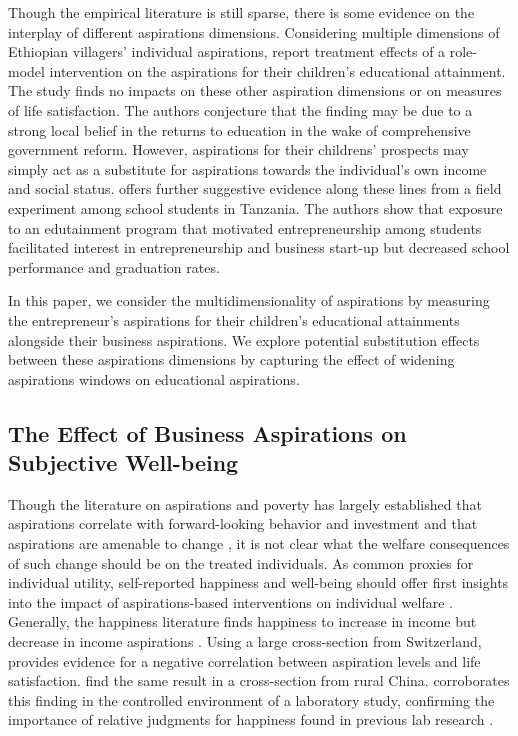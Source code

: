 \documentclass[11.5pt]{article}
\begin{document}
Though the empirical literature is still sparse, there is some evidence on the interplay of different aspirations dimensions. Considering multiple dimensions of Ethiopian villagers' individual aspirations, \citet{Bernard2014} report treatment effects of a role-model intervention on the aspirations for their children's educational attainment. The study finds no impacts on these other aspiration dimensions or on measures of life satisfaction. The authors conjecture that the finding may be due to a strong local belief in the returns to education in the wake of comprehensive government reform. However, aspirations for their childrens' prospects may simply act as a substitute for aspirations towards the individual's own income and social status. \citet{Bjorvatn2015} offers further suggestive evidence along these lines from a field experiment among school students in Tanzania. The authors show that exposure to an edutainment program that motivated entrepreneurship among students facilitated interest in entrepreneurship and business start-up but decreased school performance and graduation rates.

In this paper, we consider the multidimensionality of aspirations by measuring the entrepreneur's aspirations for their children's educational attainments alongside their business aspirations. We explore potential substitution effects between these aspirations dimensions by capturing the effect of widening aspirations windows on educational aspirations.

\subsection{The Effect of Business Aspirations  on Subjective Well-being}

Though the literature on aspirations and poverty has largely established that aspirations correlate with forward-looking behavior and investment \citep[see, e.g.,][]{Janzen2017, Dalton2018, Kosec2017, Favara2017, Ross2017, Serneels2014} and that aspirations are amenable to change \citep[e.g.,][]{Bernard2014, Macours2014, Beaman2012, McBride2010}, it is not clear what the welfare consequences of such change should be on the treated individuals. As common proxies for individual utility, self-reported happiness and well-being should offer first insights into the impact of aspirations-based interventions on individual welfare \citep[see, e.g.,][]{Clark1994, Oswald1997, Ng1997, Easterlin2001, Stutzer2004, Frey2000, Frey2002}. Generally, the happiness literature finds happiness to increase in income but decrease in income aspirations \citep[e.g.,][]{Easterlin1995, Easterlin2001, Easterlin2003, Stutzer2004, Knight2012, Clark2008, Frey2002}. Using a large cross-section from Switzerland, \citet[][]{Stutzer2004} provides evidence for a negative correlation between aspiration levels and life satisfaction. \citet{Knight2012} find the same result in a cross-section from rural China. \citet{McBride2010} corroborates this finding in the controlled environment of a laboratory study, confirming the importance of relative judgments for happiness found in previous lab research \citep[see, e.g.,][]{Tversky1991, Smith1989}.
\end{document}
